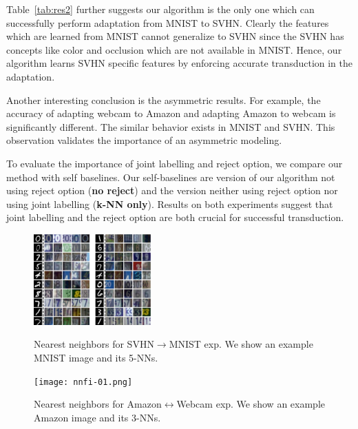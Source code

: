 Table~\ref{tab:res2} further suggests our algorithm is the only one which can successfully perform adaptation from MNIST to SVHN. Clearly the features which are learned from MNIST cannot generalize to SVHN since the SVHN has concepts like color and occlusion which are not available in MNIST. Hence, our algorithm learns SVHN specific features by enforcing accurate transduction in the adaptation.

Another interesting conclusion is the asymmetric results. For example, the accuracy of adapting webcam to Amazon and adapting Amazon to webcam is significantly different. The similar behavior exists in MNIST and SVHN. This observation validates the importance of an asymmetric modeling.

To evaluate the importance of joint labelling and reject option, we compare our method with self baselines. Our self-baselines are version of our algorithm not using reject option (\textbf{no reject}) and the version neither using reject option nor using joint labelling (\textbf{k-NN only}). Results on both experiments suggest that joint labelling and the reject option are both crucial for successful transduction. 

\begin{figure}
\small
\begin{small}
\includegraphics[width=0.4\textwidth]{nndig}
\vspace{-5mm}
\caption{Nearest neighbors for SVHN$\rightarrow$MNIST exp. We show an example MNIST image and its 5-NNs.}
\label{fig:nn}
\texttt{[image: nnfi-01.png]}
\caption{Nearest neighbors for Amazon$\leftrightarrow$Webcam exp. We show an example Amazon image and its 3-NNs. }
\label{fig:nnoffice}
\end{small}
\vspace{-15mm}
\end{figure}

